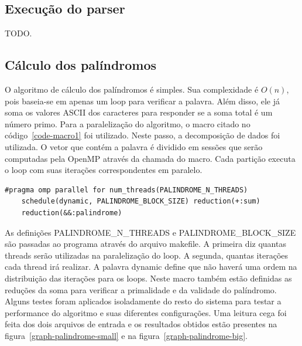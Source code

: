 \documentclass[a4paper]{article}
\begin{document}
\subsection{Execução do parser}
\indent \indent TODO.

\subsection{Cálculo dos palíndromos}
\indent \indent O algoritmo de cálculo dos palíndromos é simples. Sua complexidade é \begin{math}O(n)\end{math}, pois baseia-se em apenas um loop para verificar a palavra. Além disso, ele já soma os valores ASCII dos caracteres para responder se a soma total é um número primo. Para a paralelização do algoritmo, o macro citado no código~\ref{code-macro1} foi utilizado. Neste passo, a decomposição de dados foi utilizada. O vetor que contém a palavra é dividido em sessões que serão computadas pela OpenMP através da chamada do macro. Cada partição executa o loop com suas iterações correspondentes em paralelo.
\begin{lstlisting}[caption=Macro que paraleliza o algoritmo do palíndromo, label=code-macro1]
#pragma omp parallel for num_threads(PALINDROME_N_THREADS) 
	schedule(dynamic, PALINDROME_BLOCK_SIZE) reduction(+:sum) 
	reduction(&&:palindrome)
\end{lstlisting}
\indent \indent As definições PALINDROME\_N\_THREADS e PALINDROME\_BLOCK\_SIZE são passadas ao programa através do arquivo makefile. A primeira diz quantas threads serão utilizadas na paralelização do loop. A segunda, quantas iterações cada thread irá realizar. A palavra dynamic define que não haverá uma ordem na distribuição das iterações para os loops. Neste macro também estão definidas as reduções da soma para verificar a primalidade e da validade do palíndromo.\\
\indent Alguns testes foram aplicados isoladamente do resto do sistema para testar a performance do algoritmo e suas diferentes configurações. Uma leitura cega foi feita dos dois arquivos de entrada e os resultados obtidos estão presentes na figura~\ref{graph-palindrome-small} e na figura~\ref{graph-palindrome-big}.
\end{document}
